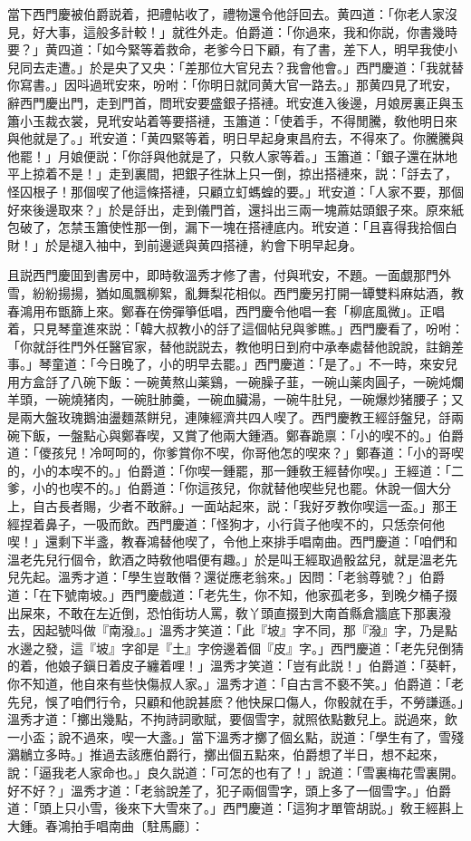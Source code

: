 當下西門慶被伯爵説着，把禮帖收了，禮物還令他㧱回去。黄四道：「你老人家沒見，好大事，這般多計較！」就徃外走。伯爵道：「你過來，我和你説，你書幾時要？」黄四道：「如今緊等着救命，老爹今日下顧，有了書，差下人，明早我使小兒同去走遭。」於是央了又央：「差那位大官兒去？我會他會。」西門慶道：「我就替你寫書。」因呌過玳安來，吩咐：「你明日就同黄大官一路去。」那黄四見了玳安，辭西門慶出門，走到門首，問玳安要盛銀子搭褳。玳安進入後邊，月娘房裏正與玉簫小玉裁衣裳，見玳安站着等要搭褳，玉簫道：「使着手，不得閒騰，敎他明日來與他就是了。」玳安道：「黄四緊等着，明日早起身東昌府去，不得來了。你騰騰與他罷！」月娘便説：「你㧱與他就是了，只敎人家等着。」玉簫道：「銀子還在牀地平上掠着不是！」走到裏間，把銀子徃牀上只一倒，掠出搭褳來，説：「㧱去了，怪囚根子！那個喫了他這條搭褳，只顧立虰螞蝗的要。」玳安道：「人家不要，那個好來後邊取來？」於是㧱出，走到儀門首，還抖出三兩一塊蔴姑頭銀子來。原來紙包破了，怎禁玉簫使性那一倒，漏下一塊在搭褳底内。玳安道：「且喜得我拾個白財！」於是褪入袖中，到前邊遞與黄四搭褳，約會下明早起身。

且説西門慶囬到書房中，即時敎溫秀才修了書，付與玳安，不題。一面覷那門外雪，紛紛揚揚，猶如風飄柳絮，亂舞梨花相似。西門慶另打開一罈雙料麻姑酒，教春鴻用布甑篩上來。鄭春在傍彈箏低唱，西門慶令他唱一套「柳底風微」。正唱着，只見琴童進來説：「韓大叔教小的㧱了這個帖兒與爹瞧。」西門慶看了，吩咐：「你就㧱徃門外任醫官家，替他説説去，教他明日到府中承奉處替他說說，註銷差事。」琴童道：「今日晚了，小的明早去罷。」西門慶道：「是了。」不一時，來安兒用方盒㧱了八碗下飯：一碗黄熬山薬鷄，一碗臊子韮，一碗山薬肉圓子，一碗炖爛羊頭，一碗燒猪肉，一碗肚肺羹，一碗血臟湯，一碗牛肚兒，一碗爆炒猪腰子；又是兩大盤玫瑰鵝油盪麵蒸餅兒，連陳經濟共四人喫了。西門慶教王經㧱盤兒，㧱兩碗下飯，一盤點心與鄭春喫，又賞了他兩大鍾酒。鄭春跪禀：「小的喫不的。」伯爵道：「儍孩兒！冷呵呵的，你爹賞你不喫，你哥他怎的喫來？」鄭春道：「小的哥喫的，小的本喫不的。」伯爵道：「你喫一鍾罷，那一鍾敎王經替你喫。」王經道：「二爹，小的也喫不的。」伯爵道：「你這孩兒，你就替他喫些兒也罷。休說一個大分上，自古長者賜，少者不敢辭。」一面站起來，説：「我好歹教你喫這一盃。」那王經捏着鼻子，一吸而飲。西門慶道：「怪狗才，小行貨子他喫不的，只恁奈何他喫！」還剩下半盞，教春鴻替他喫了，令他上來排手唱南曲。西門慶道：「咱們和溫老先兒行個令，飲酒之時敎他唱便有趣。」於是叫王經取過骰盆兒，就是溫老先兒先起。溫秀才道：「學生豈敢僭？還従應老翁來。」因問：「老翁尊號？」伯爵道：「在下號南坡。」西門慶戲道：「老先生，你不知，他家孤老多，到晚夕桶子掇出屎來，不敢在左近倒，恐怕街坊人罵，敎丫頭直掇到大南首縣倉牆底下那裏潑去，因起號呌做『南潑』。」溫秀才笑道：「此『坡』字不同，那『潑』字，乃是點水邊之發，這『坡』字卻是『土』字傍邊着個『皮』字。」西門慶道：「老先兒倒猜的着，他娘子鎭日着皮子纏着哩！」溫秀才笑道：「豈有此説！」伯爵道：「葵軒，你不知道，他自來有些快傷叔人家。」溫秀才道：「自古言不褻不笑。」伯爵道：「老先兒，悞了咱們行令，只顧和他說甚麽？他快屎口傷人，你骰就在手，不勞謙遜。」溫秀才道：「擲出幾點，不拘詩詞歌賦，要個雪字，就照依點數兒上。説過來，飲一小盃；說不過來，喫一大盞。」當下溫秀才擲了個幺點，説道：「學生有了，雪殘鸂鶒立多時。」推過去該應伯爵行，擲出個五點來，伯爵想了半日，想不起來，說：「逼我老人家命也。」良久説道：「可怎的也有了！」說道：「雪裏梅花雪裏開。好不好？」溫秀才道：「老翁說差了，犯子兩個雪字，頭上多了一個雪字。」伯爵道：「頭上只小雪，後來下大雪來了。」西門慶道：「這狗才單管胡説。」敎王經斟上大鍾。春鴻拍手唱南曲〔駐馬廳〕：

